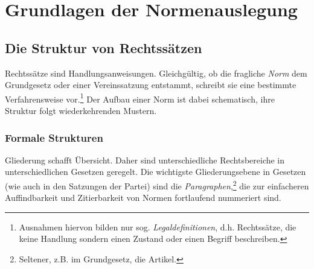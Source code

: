 
\chapter{Grundlagen der Normenauslegung}

\section{Die Struktur von Rechtssätzen}
Rechtssätze sind Handlungsanweisungen.
Gleichgültig, ob die fragliche \emph{Norm} dem Grundgesetz oder einer Vereinssatzung entstammt, schreibt sie eine bestimmte Verfahrensweise vor.\footnote{Ausnahmen hiervon bilden nur sog. \emph{Legaldefinitionen}, d.h. Rechtssätze, die keine Handlung sondern einen Zustand oder einen Begriff beschreiben.}
Der Aufbau einer Norm ist dabei schematisch, ihre Struktur folgt wiederkehrenden Mustern.

\subsection{Formale Strukturen}
Gliederung schafft Übersicht.
Daher sind unterschiedliche Rechtsbereiche in unterschiedlichen Gesetzen geregelt.
Die wichtigste Gliederungsebene in Gesetzen (wie auch in den Satzungen der Partei) sind die \emph{Paragraphen},\footnote{Seltener, z.B. im Grundgesetz, die Artikel.} die zur einfacheren Auffindbarkeit und Zitierbarkeit von Normen fortlaufend nummeriert sind.

